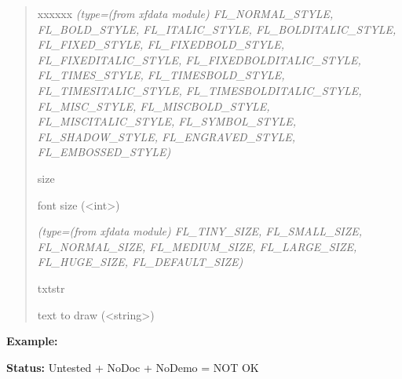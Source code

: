 \begin{boxedminipage}{\funcwidth}
\begin{quote}
\begin{Ventry}{xxxxxx}
            {\it (type=(from xfdata module) FL\_NORMAL\_STYLE, FL\_BOLD\_STYLE, FL\_ITALIC\_STYLE,
FL\_BOLDITALIC\_STYLE, FL\_FIXED\_STYLE, FL\_FIXEDBOLD\_STYLE, 
FL\_FIXEDITALIC\_STYLE, FL\_FIXEDBOLDITALIC\_STYLE, FL\_TIMES\_STYLE, 
FL\_TIMESBOLD\_STYLE, FL\_TIMESITALIC\_STYLE, FL\_TIMESBOLDITALIC\_STYLE, 
FL\_MISC\_STYLE, FL\_MISCBOLD\_STYLE, FL\_MISCITALIC\_STYLE, 
FL\_SYMBOL\_STYLE, FL\_SHADOW\_STYLE, FL\_ENGRAVED\_STYLE, 
FL\_EMBOSSED\_STYLE)}

          \item[size]

          font size ({\textless}int{\textgreater})

            {\it (type=(from xfdata module) FL\_TINY\_SIZE, FL\_SMALL\_SIZE, FL\_NORMAL\_SIZE, 
FL\_MEDIUM\_SIZE, FL\_LARGE\_SIZE, FL\_HUGE\_SIZE, FL\_DEFAULT\_SIZE)}

          \item[txtstr]

          text to draw ({\textless}string{\textgreater})

        \end{Ventry}

      \end{quote}

\textbf{Example:} 

\textbf{Status:} Untested + NoDoc + NoDemo = NOT OK



    \end{boxedminipage}

    \label{xformslib:library:fl_drw_text_cursor}

    \vspace{0.5ex}


